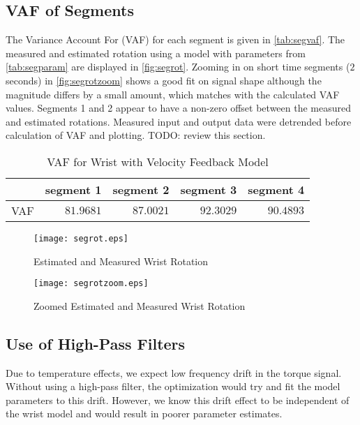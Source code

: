 \documentclass[11pt,a4paper]{article}
\begin{document}
\subsection{VAF of Segments}
The Variance Account For (VAF) for each segment is given in
\autoref{tab:segvaf}.
The measured and estimated rotation using a model with
parameters from \autoref{tab:segparam} are displayed in \autoref{fig:segrot}.
Zooming in on short time segments ($2$ seconds) in \autoref{fig:segrotzoom}
shows a good fit on signal shape although the magnitude differs by a small
amount, which matches with the calculated VAF values. Segments 1 and 2 appear
to have a non-zero offset between the measured and estimated rotations.
Measured input and output data were detrended before calculation of VAF and
plotting. TODO: review this section.
\begin{table}
    \centering
    \begin{tabular}{|l|r|r|r|r|}
        \hline
        \nonumber & segment 1 & segment 2 & segment 3 & segment 4 \\
        \hline
        VAF & $81.9681$ & $87.0021$ & $92.3029$ & $90.4893$ \\
        \hline
    \end{tabular}
    \caption{VAF for Wrist with Velocity Feedback Model}
    \label{tab:segvaf}
\end{table}

\begin{figure}
    \centering
    \texttt{[image: segrot.eps]}
    \caption{Estimated and Measured Wrist Rotation}
    \label{fig:segrot}
\end{figure}

\begin{figure}
    \centering
    \texttt{[image: segrotzoom.eps]}
    \caption{Zoomed Estimated and Measured Wrist Rotation}
    \label{fig:segrotzoom}
\end{figure}

\subsection{Use of High-Pass Filters}
Due to temperature effects, we expect low frequency drift in the torque signal.
Without using a high-pass filter, the optimization would try and fit the model
parameters to this drift. However, we know this drift effect to be independent
of the wrist model and would result in poorer parameter estimates.

\end{document}

